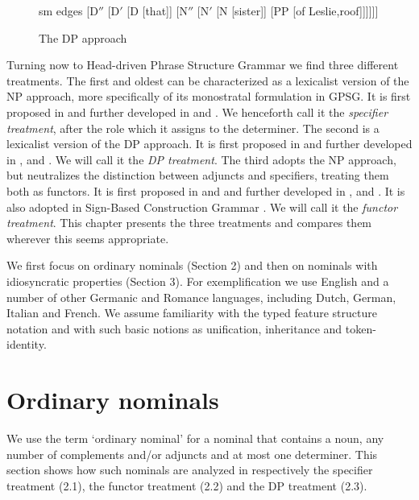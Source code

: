 \documentclass[output=paper
                ,modfonts
                ,nonflat
	        ,collection
	        ,collectionchapter
	        ,collectiontoclongg
 	        ,biblatex
                ,babelshorthands
                ,newtxmath
                ,draftmode
                ,colorlinks, citecolor=brown
]{./langsci/langscibook}
\begin{document}
\begin{figure}
	\centering
	\begin{forest}
sm edges
[D$''$ 
	[D$'$
		[D [that]]
		[N$''$
			[N$'$ 
				[N [sister]]
				[PP [of Leslie,roof]]]]]]
	\end{forest}
	\caption{\label{abn} The DP approach} 
\end{figure}
     
Turning now to Head-driven Phrase Structure Grammar we find three different treatments.  
The first and oldest can be characterized as a lexicalist version of the NP approach, more 
specifically of its monostratal formulation in GPSG.  
It is first proposed in \citet{ps} and further developed in \citet{ps2} and 
\citet{GS00}. We henceforth call it the \emph{specifier treatment}, 
after the role which it assigns to the determiner. 
The second is a lexicalist version of the DP approach.  
It is first proposed in \citet{Netter94} and further developed in \citet{Netter96a},
and \citet{NerbonneMullen00}. We will call it the \emph{DP treatment}. 
The third adopts the NP approach, but neutralizes the distinction between adjuncts and specifiers, 
treating them both as functors. It is first proposed in \citet{VanEynde98a} and 
\citet{Allegranza98} and further developed in \citet{VanEynde03}, \citet{VanEynde06} 
and \citet{Allegranza06}. It is also adopted in Sign-Based Construction Grammar \citep{Sag2012}. 
We will call it the \emph{functor treatment}. This chapter presents the three treatments and 
compares them wherever this seems appropriate.  

We first focus on ordinary nominals (Section 2) and then on nominals with idiosyncratic 
properties (Section 3). For exemplification we use English and a number of other Germanic 
and Romance languages, including Dutch, German, Italian and French.  
We assume familiarity with the typed feature structure notation and with such basic notions 
as unification, inheritance and token-identity. 
    

\section{Ordinary nominals} 


We use the term `ordinary nominal' for a nominal that contains a noun, 
any number of complements and/or adjuncts and at most one determiner. 
This section shows how such nominals are analyzed in respectively the 
specifier treatment (2.1), the functor treatment (2.2) and the DP treatment (2.3).  
\end{document}
